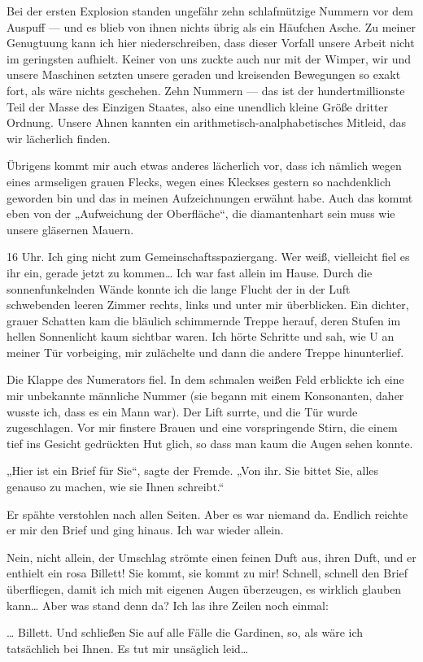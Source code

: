 Bei der ersten Explosion standen ungefähr zehn schlafmützige
Nummern vor dem Auspuff — und es blieb von ihnen nichts übrig als
ein Häufchen Asche. Zu meiner Genugtuung kann ich hier
niederschreiben, dass dieser Vorfall unsere Arbeit nicht im
geringsten aufhielt. Keiner von uns zuckte auch nur mit der Wimper,
wir und unsere Maschinen setzten unsere geraden und kreisenden
Bewegungen so exakt fort, als wäre nichts geschehen. Zehn Nummern —
das ist der hundertmillionste Teil der Masse des Einzigen Staates,
also eine unendlich kleine Größe dritter Ordnung. Unsere Ahnen
kannten ein arithmetisch-analphabetisches Mitleid, das wir
lächerlich finden.

Übrigens kommt mir auch etwas anderes lächerlich vor, dass ich
nämlich wegen eines armseligen grauen Flecks, wegen eines Kleckses
gestern so nachdenklich geworden bin und das in meinen
Aufzeichnungen erwähnt habe. Auch das kommt eben von der
„Aufweichung der Oberfläche“, die diamantenhart sein muss wie
unsere gläsernen Mauern.

16 Uhr. Ich ging nicht zum Gemeinschaftsspaziergang. Wer weiß,
vielleicht fiel es ihr ein, gerade jetzt zu kommen\ldots{} Ich war fast
allein im Hause. Durch die sonnenfunkelnden Wände konnte ich die
lange Flucht der in der Luft schwebenden leeren Zimmer rechts,
links und unter mir überblicken. Ein dichter, grauer Schatten kam
die bläulich schimmernde Treppe herauf, deren Stufen im hellen
Sonnenlicht kaum sichtbar waren. Ich hörte Schritte und sah, wie U
an meiner Tür vorbeiging, mir zulächelte und dann die andere Treppe
hinunterlief.

Die Klappe des Numerators fiel. In dem schmalen
weißen Feld erblickte ich eine mir unbekannte männliche Nummer (sie
begann mit einem Konsonanten, daher wusste ich, dass es ein Mann
war). Der Lift surrte, und die Tür wurde zugeschlagen. Vor mir
finstere Brauen und eine vorspringende Stirn, die einem tief ins
Gesicht gedrückten Hut glich, so dass man kaum die Augen sehen
konnte.

„Hier ist ein Brief für Sie“, sagte der Fremde. „Von ihr.
Sie bittet Sie, alles genauso zu machen, wie sie Ihnen schreibt.“

Er spähte verstohlen nach allen Seiten. Aber es war niemand da.
Endlich reichte er mir den Brief und ging hinaus. Ich war wieder
allein.

Nein, nicht allein, der Umschlag strömte einen feinen Duft aus,
ihren Duft, und er enthielt ein rosa Billett! Sie kommt, sie kommt
zu mir! Schnell, schnell den Brief überfliegen, damit ich mich mit
eigenen Augen überzeugen, es wirklich glauben kann\ldots{} Aber was
stand denn da? Ich las ihre Zeilen noch einmal:
\begin{brief}
\ldots{} Billett. Und
schließen Sie auf alle Fälle die Gardinen, so, als wäre ich
tatsächlich bei Ihnen. Es tut mir unsäglich leid\ldots{}
\end{brief}


